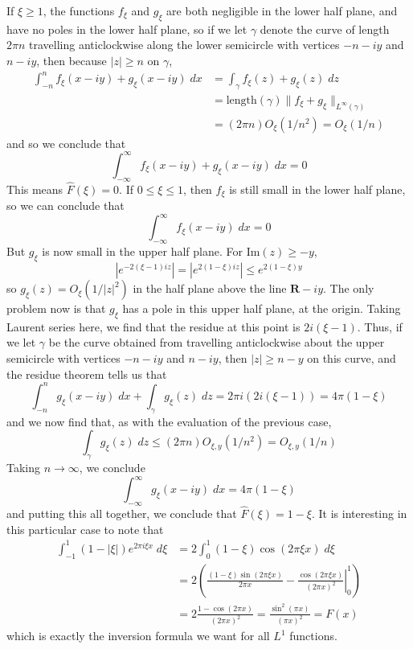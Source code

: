\begin{example}
	If $\xi \geq 1$, the functions $f_\xi$ and $g_\xi$ are both negligible in the lower half plane, and have no poles in the lower half plane, so if we let $\gamma$ denote the curve of length $2 \pi n$ travelling anticlockwise along the lower semicircle with vertices $-n - iy$ and $n - iy$, then because $|z| \geq n$ on $\gamma$,
	\begin{align*}
		\int_{-n}^n f_\xi(x - iy) + g_\xi(x - iy)\; dx &= \int_\gamma f_\xi(z) + g_\xi(z)\; dz\\
		&= \text{length}(\gamma) \| f_\xi + g_\xi \|_{L^\infty(\gamma)}\\
		&= (2 \pi n) O_\xi(1/n^2) = O_\xi(1/n)
	\end{align*}
	and so we conclude that
	\[ \int_{-\infty}^\infty f_\xi(x - iy) + g_\xi(x - iy)\; dx = 0 \]
	This means $\widehat{F}(\xi) = 0$. If $0 \leq \xi \leq 1$, then $f_\xi$ is still small in the lower half plane, so we can conclude that
	\[ \int_{-\infty}^\infty f_\xi(x - iy)\; dx = 0 \]
	But $g_\xi$ is now small in the upper half plane. For $\text{Im}(z) \geq -y$,
	\[ |e^{-2(\xi - 1)iz}| = |e^{2(1 - \xi)iz}| \leq e^{2(1 - \xi)y} \] 
	so $g_\xi(z) = O_\xi(1/|z|^2)$ in the half plane above the line $\mathbf{R} - iy$. The only problem now is that $g_\xi$ has a pole in this upper half plane, at the origin. Taking Laurent series here, we find that the residue at this point is $2i(\xi - 1)$. Thus, if we let $\gamma$ be the curve obtained from travelling anticlockwise about the upper semicircle with vertices $-n - iy$ and $n - iy$, then $|z| \geq n - y$ on this curve, and the residue theorem tells us that
	\[ \int_{-n}^n g_\xi(x - iy)\; dx + \int_\gamma g_\xi(z)\; dz = 2\pi i (2i(\xi - 1)) = 4 \pi (1 - \xi) \]
	and we now find that, as with the evaluation of the previous case,
	\[ \int_\gamma g_\xi(z)\; dz \leq (2 \pi n) O_{\xi,y}(1/n^2) = O_{\xi,y}(1/n) \]
	Taking $n \to \infty$, we conclude
	\[ \int_{-\infty}^\infty g_\xi(x - iy)\; dx = 4 \pi (1 - \xi) \]
	and putting this all together, we conclude that $\widehat{F}(\xi) = 1 - \xi$. It is interesting in this particular case to note that
	\begin{align*}
		\int_{-1}^1 (1 - |\xi|) e^{2 \pi i\xi x}\; d\xi &= 2 \int_0^1 (1 - \xi) \cos(2 \pi \xi x)\; d\xi\\
		&= 2 \left( \left. \frac{(1 - \xi) \sin(2 \pi \xi x)}{2 \pi x} - \frac{\cos(2 \pi \xi x)}{(2 \pi x)^2} \right|_0^1 \right)\\
		&= 2 \frac{1 - \cos(2 \pi x)}{(2 \pi x)^2} = \frac{\sin^2(\pi x)}{(\pi x)^2} = F(x)
	\end{align*}
	which is exactly the inversion formula we want for all $L^1$ functions.
\end{example}

